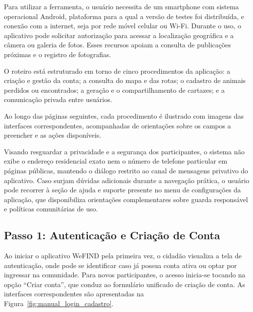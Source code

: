 Para utilizar a ferramenta, o usuário necessita de um smartphone com sistema operacional Android, plataforma para a qual a versão de testes foi distribuída, e conexão com a internet, seja por rede móvel celular ou Wi-Fi. Durante o uso, o aplicativo pode solicitar autorização para acessar a localização geográfica e a câmera ou galeria de fotos. Esses recursos apoiam a consulta de publicações próximas e o registro de fotografias.

O roteiro está estruturado em torno de cinco procedimentos da aplicação: a criação e gestão da conta; a consulta do mapa e das rotas; o cadastro de animais perdidos ou encontrados; a geração e o compartilhamento de cartazes; e a comunicação privada entre usuários.

Ao longo das páginas seguintes, cada procedimento é ilustrado com imagens das interfaces correspondentes, acompanhadas de orientações sobre os campos a preencher e as ações disponíveis.

Visando resguardar a privacidade e a segurança dos participantes, o sistema não exibe o endereço residencial exato nem o número de telefone particular em páginas públicas, mantendo o diálogo restrito ao canal de mensagens privativo do aplicativo. Caso surjam dúvidas adicionais durante a navegação prática, o usuário pode recorrer à seção de ajuda e suporte presente no menu de configurações da aplicação, que disponibiliza orientações complementares sobre guarda responsável e políticas comunitárias de uso.

\clearpage

\renewcommand{\thefigure}{C\arabic{figure}}
\renewcommand{\theHfigure}{C\arabic{figure}}
\setcounter{figure}{0}

\subsection*{Passo 1: Autenticação e Criação de Conta}
\noindent
Ao iniciar o aplicativo WeFIND pela primeira vez, o cidadão visualiza a tela de autenticação, onde pode se identificar caso já possua conta ativa ou optar por ingressar na comunidade. Para novos participantes, o acesso inicia-se tocando na opção ``Criar conta'', que conduz ao formulário unificado de criação de conta. As interfaces correspondentes são apresentadas na Figura~\ref{fig:manual_login_cadastro}.

